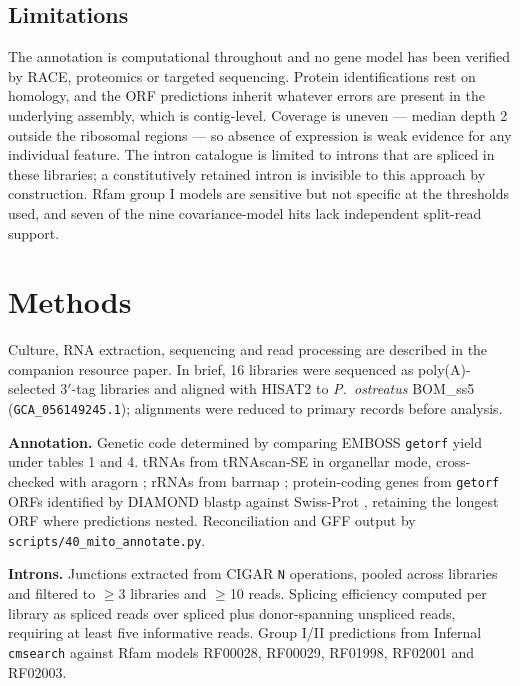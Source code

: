 \subsection{Limitations}

The annotation is computational throughout and no gene model has been verified by RACE,
proteomics or targeted sequencing. Protein identifications rest on homology, and the ORF
predictions inherit whatever errors are present in the underlying assembly, which is
contig-level. Coverage is uneven --- median depth 2 outside the ribosomal regions --- so absence
of expression is weak evidence for any individual feature. The intron catalogue is limited to
introns that are spliced in these libraries; a constitutively retained intron is invisible to
this approach by construction. Rfam group I models are sensitive but not specific at the
thresholds used, and seven of the nine covariance-model hits lack independent split-read
support.

\section{Methods}

Culture, RNA extraction, sequencing and read processing are described in the companion resource
paper. In brief, 16 libraries were sequenced as poly(A)-selected 3$'$-tag libraries and aligned
with HISAT2 \cite{kim2019hisat2} to \textit{P.\ ostreatus} BOM\_ss5
(\texttt{GCA\_056149245.1}); alignments were reduced to primary records before analysis.

\textbf{Annotation.} Genetic code determined by comparing EMBOSS \texttt{getorf} yield under
tables 1 and 4. tRNAs from tRNAscan-SE \cite{chan2021trnascan} in organellar mode, cross-checked
with aragorn \cite{laslett2004aragorn}; rRNAs from barrnap \cite{seemann2013barrnap};
protein-coding genes from \texttt{getorf} ORFs identified by DIAMOND \cite{buchfink2015diamond}
blastp against Swiss-Prot \cite{uniprot2023}, retaining the longest ORF where predictions
nested. Reconciliation and GFF output by \texttt{scripts/40\_mito\_annotate.py}.

\textbf{Introns.} Junctions extracted from CIGAR \texttt{N} operations, pooled across libraries
and filtered to $\geq$3 libraries and $\geq$10 reads. Splicing efficiency computed per library
as spliced reads over spliced plus donor-spanning unspliced reads, requiring at least five
informative reads. Group I/II predictions from Infernal \cite{nawrocki2013infernal}
\texttt{cmsearch} against Rfam \cite{kalvari2021rfam} models RF00028, RF00029, RF01998, RF02001
and RF02003.

